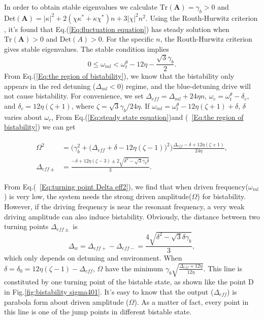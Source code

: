 \documentclass[pra,aps,superscriptaddress,showpacs,preprint]{revtex4}%
\begin{document}
In order to obtain stable eigenvalues we calculate
$\text{Tr}(\textbf{A})=\gamma_{b}>0$ and $\text{Det}(\textbf{A})=|\kappa|^2+2(\chi\kappa^{\ast}+\kappa\chi^{\ast})n+3|\chi|^{2}n^{2}$.
Using the Routh-Hurwitz criterion \cite{DeJesusPra1987}, it's found that Eq.(\ref{Eq:fluctuation equation}) has steady solution when $\text{Tr}(\textbf{A})>0$ and $\text{Det}(A)>0$.
For the specific $n$, the Routh-Hurwitz criterion gives stable eigenvalues. The stable condition implies
\begin{equation}
0\leq\omega_{ml}<\omega_{t}^{\theta}-12\eta-\frac{\sqrt{3}\gamma_{b}}{2}
\label{Eq:the region of bistability}.
\end{equation}
From Eq.(\ref{Eq:the region of bistability}), we know that the bistability only appears in the red detuning ($\Delta_{ml}<0$) regime, and the blue-detuning drive will not cause bistability.
For convenience, we set $\Delta_{eff}=\Delta_{ml}+24\eta n$, $\omega_{c}=\omega_{t}^{\theta}-\delta_{c}$, and  $\delta_{c}=12\eta(\zeta+1)$, where $\zeta={\sqrt{3}\gamma_{b}}/{24\eta}$. If $\omega_{ml}=\omega_{t}^{\theta}-12\eta(\zeta+1)+\delta$, $\delta$ varies about $\omega_{c}$, From Eq.(\ref{Eq:steady state equation})and (~\ref{Eq:the region of bistability}) we can get
\begin{widetext}
\begin{eqnarray}
\begin{aligned}
\Omega^{2}&=\Big(\gamma_{b}^{2}+\big(\Delta_{eff}+\delta-12\eta(\zeta-1)\big)^{2}\Big)\frac{\Delta_{eff}-\delta+12\eta(\zeta+1)}{24\eta} \label{Eq:steady equation Delta eff2},\\
\Delta_{eff\pm}&=\frac{-\delta+12\eta(\zeta-3)\pm2\sqrt{\delta^{2}-\sqrt{3}\gamma_{b}\delta}}{3}
\label{Eq:turning point Delta eff2}.
\end{aligned}
\end{eqnarray}
\end{widetext}
From Eq.(~\ref{Eq:turning point Delta eff2}), we find that when driven frequency($\omega_{ml}$) is very low, the system needs the strong driven amplitude($\Omega$) for bistability. However, if the driving frequency is near the resonant frequency, a very weak driving amplitude can also induce bistability. Obviously, the distance between two turning points $\Delta_{eff\pm}$ is
\begin{equation}
\Delta_{w}=\Delta_{eff+}-\Delta_{eff-}=\frac{4\sqrt{\delta^{2}-\sqrt{3}\delta\gamma_{b}}}{3}
\label{Eq:dispalcement of turning points},
\end{equation}
which only depends on detuning and environment. When $\delta=\delta_{0}=12\eta(\zeta-1)-\Delta_{eff}$, $\Omega$ have the minimum $\gamma_{b}\sqrt{\frac{\Delta_{eff}+12\eta}{12\eta}}$.
 This line is constituted by one turning point of the bistable state, as shown like the point D in Fig.\ref{fig:bistability sigma401}. It's easy to know that the output ($\Delta_{eff}$) is parabola form about driven amplitude ($\Omega$). As a matter of fact, every point in this line is one of the jump points in different bistable state.
\end{document}
